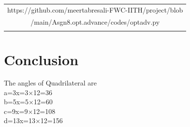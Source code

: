\documentclass[journal,10pt,twocolumn]{article}
\begin{document}
\begin{table}[h]
\centering
\begin{tabular}{|c|} \hline
\rule{0pt}{10pt} 
https://github.com/meertabresali-FWC-IITH/project/blob \\
/main/Asgn8.opt.advance/codes/optadv.py\\
\\\hline
 \end{tabular}
\end{table}




\section{Conclusion}
\begin{flushleft}
The angles of Quadrilateral are\\
\vspace{0.25cm}
a=3x=3×12=36\textdegree\\
\vspace{0.25cm}
b=5x=5×12=60\textdegree\\
\vspace{0.25cm}
c=9x=9×12=108\textdegree\\
\vspace{0.25cm}
d=13x=13×12=156\textdegree
\end{flushleft}
\endcenter
\end{document}
